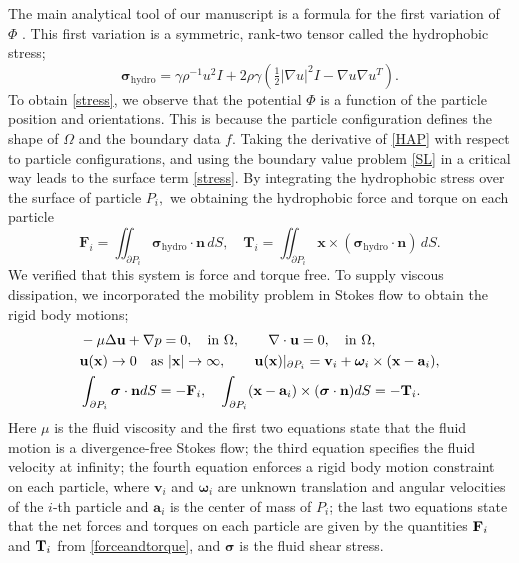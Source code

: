 The main analytical tool of our manuscript 
is a formula for the first variation of $\Phi$ \cite{Bandle2015,Schiffer1954,Grinfeld2010}. 
This first variation  is a symmetric, rank-two tensor called the hydrophobic stress;
\begin{equation}
  \label{stress}
\boldsymbol{\sigma}_{\text{hydro}} = \gamma \rho^{-1} u^2 I + 2\rho \gamma (\tfrac{1}{2}|\nabla u|^2I - \nabla u \nabla u^T).
\end{equation}
To obtain \eqref{stress}, we observe that the potential $\Phi$ is a function of the particle position and orientations.
This is because the particle configuration defines the shape of $\Omega$ and the boundary data $f.$ 
Taking the derivative of \eqref{HAP} with respect to particle configurations, and using the boundary value problem \eqref{SL}
in a critical way leads to the surface term \eqref{stress}.  
By integrating the hydrophobic stress over the surface of particle $P_i,$ we obtaining the hydrophobic force and torque on each particle 
\begin{equation}
  \label{forceandtorque}
  \mathbf{F}_i = \iint_{\partial P_i} \boldsymbol{\sigma}_{\text{hydro}} \cdot \mathbf{n} \,dS,\quad
  \mathbf{T}_i = \iint_{\partial P_i} \mathbf{x} \times (\boldsymbol{\sigma}_{\text{hydro}} \cdot \mathbf{n}) \,dS.
\end{equation}
We verified that this system is force and torque free.
To supply viscous dissipation, 
we incorporated the mobility problem in Stokes flow to obtain the rigid body motions; 
\begin{equation}
\label{eq:stokes}
\begin{aligned}
&-\mu \Delta {\bf u} + \nabla p = 0, \quad \text{in}\ \Omega, \qquad 
\nabla \cdot {\bf u} = 0,  \quad \text{in}\ \Omega,\\
&{\bf u}({\bf x}) \to 0 \quad \text{as}\ |{\bf x}|\to \infty,\qquad 
  \mathbf{u}(\mathbf{x})|_{\partial P_i} = \mathbf{v}_i +
\boldsymbol{\omega}_i\times(\mathbf{x} - \mathbf{a}_i),\\
&\int_{\partial P_i}\boldsymbol{\sigma}\cdot {\bf n} dS=-{\bf F}_i, \quad
\int_{\partial P_i}(\mathbf{x}-\mathbf{a}_i)\times (\boldsymbol{\sigma} \cdot \mathbf{n}) dS=-{\bf T}_i.
\end{aligned}
\end{equation}
Here $\mu$ is the fluid viscosity and the first two equations state
that the fluid motion is a
divergence-free Stokes flow; the third equation specifies the fluid
velocity at infinity;
the fourth equation enforces a rigid body motion constraint on each
particle, where
$\mathbf{v}_i$ and $\boldsymbol{\omega}_i$ are unknown translation and
angular velocities
of the $i$-th particle and $\mathbf{a}_i$ is the center of mass of $P_i$;
the last two equations state that the net forces and torques
on each particle are given by the quantities ${\bf F}_i$ and ${\bf T}_i$
from \eqref{forceandtorque}, and $\boldsymbol{\sigma}$ is the fluid shear stress. 

